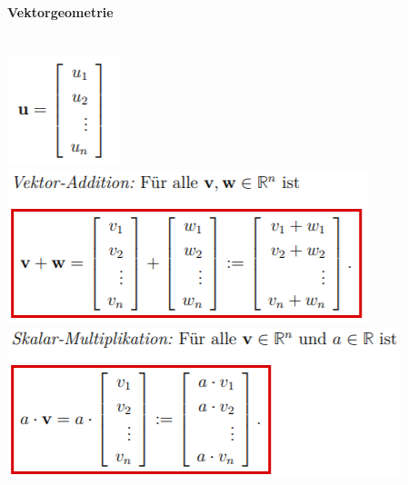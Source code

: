\paragraph{Vektorgeometrie}\mbox{}\\
\noindent
\includegraphics[width=\columnwidth]{./images/vek.png}
\includegraphics[width=\columnwidth]{./images/vek1.png}
\includegraphics[width=\columnwidth]{./images/vek2.png}
